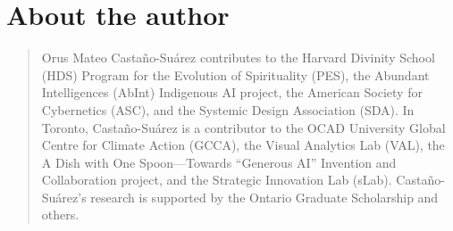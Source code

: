 \chapter*{\centering About the author}
\label{About the author}
\noindent
\begin{quote}
    Orus Mateo Castaño-Suárez contributes to the Harvard Divinity School (HDS) Program for the Evolution of Spirituality (PES), the Abundant Intelligences (AbInt) Indigenous AI project, the American Society for Cybernetics (ASC), and the Systemic Design Association (SDA). In Toronto, Castaño-Suárez is a contributor to the OCAD University Global Centre for Climate Action (GCCA), the Visual Analytics Lab (VAL), the A Dish with One Spoon—Towards “Generous AI” Invention and Collaboration project, and the Strategic Innovation Lab (sLab). Castaño-Suárez's research is supported by the Ontario Graduate Scholarship and others.
\end{quote}
    \vspace*{\fill} %
    \newpage